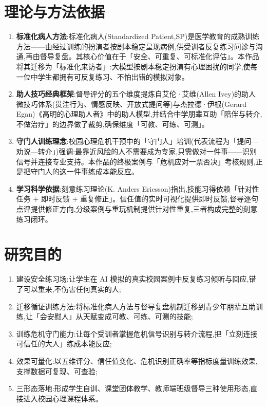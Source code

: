 \documentclass[zihao=-4, a4paper]{ctexart}
\begin{document}
\section{理论与方法依据}
\begin{enumerate}[leftmargin=2em, itemsep=3pt]
\item \textbf{标准化病人方法}:标准化病人(Standardized Patient,SP)是医学教育的成熟训练方法——由经过训练的扮演者按剧本稳定呈现病例,供受训者反复练习问诊与沟通,再由督导复盘。其核心价值在于「安全、可重复、可标准化评估」。本作品将其迁移为「标准化来访者」:大模型按剧本稳定扮演有心理困扰的同学,使每一位中学生都拥有可反复练习、不怕出错的模拟对象。
\item \textbf{助人技巧经典框架}:督导评分的五个维度提炼自艾伦·艾维(Allen Ivey)的助人微技巧体系(贯注行为、情感反映、开放式提问等)与杰拉德·伊根(Gerard Egan)《高明的心理助人者》中的助人模型,并结合中学朋辈互助「陪伴与转介,不做治疗」的边界做了裁剪,确保维度「可教、可练、可测」。
\item \textbf{守门人训练理念}:校园心理危机干预中的「守门人」培训(代表流程为「提问—劝说—转介」)强调:最靠近风险的人不需要成为专家,只需做对一件事——识别信号并连接专业支持。本作品的终极案例与「危机应对一票否决」考核规则,正是把守门人的这一件事练成本能反应。
\item \textbf{学习科学依据}:刻意练习理论(K. Anders Ericsson)指出,技能习得依赖「针对性任务 + 即时反馈 + 重复修正」。信任值的实时可视化提供即时反馈,督导逐句点评提供修正方向,分级案例与重玩机制提供针对性重复,三者构成完整的刻意练习闭环。
\end{enumerate}

\section{研究目的}
\begin{enumerate}[leftmargin=2em, itemsep=2pt]
\item 建设安全练习场:让学生在 AI 模拟的真实校园案例中反复练习倾听与回应,错了可以重来,不伤害任何真实的人;
\item 迁移循证训练方法:将标准化病人方法与督导复盘机制迁移到青少年朋辈互助训练,让「会安慰人」从天赋变成可教、可练、可测的技能;
\item 训练危机守门能力:让每个受训者掌握危机信号识别与转介流程,把「立刻连接可信任的大人」练成本能反应;
\item 效果可量化:以五维评分、信任值变化、危机识别正确率等指标度量训练效果,支撑数据可复现、可查验;
\item 三形态落地:形成学生自训、课堂团体教学、教师端班级督导三种使用形态,直接进入校园心理课程体系。
\end{enumerate}
\end{document}
